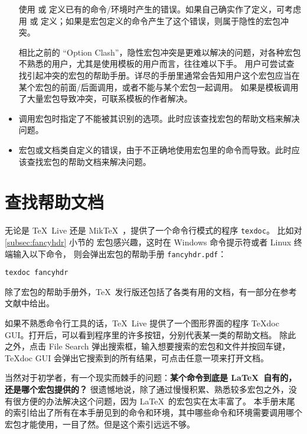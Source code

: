 \begin{itemize}
使用  或  定义已有的命令/环境时产生的错误。如果自己确实作了定义，可考虑用
 或  定义；如果是宏包定义的命令产生了这个错误，则属于隐性的宏包冲突。

相比之前的 ``Option Clash''{}，隐性宏包冲突是更难以解决的问题，对各种宏包不熟悉的用户，尤其是使用模板的用户而言，往往难以下手。
用户可尝试查找引起冲突的宏包的帮助手册。详尽的手册里通常会告知用户这个宏包应当在某个宏包的前面/后面调用，或者不能与某个宏包一起调用。
如果是模板调用了大量宏包导致冲突，可联系模板的作者解决。

\item {}

调用宏包时指定了不能被其识别的选项。此时应该查找宏包的帮助文档来解决问题。

\item {}

宏包或文档类自定义的错误，由于不正确地使用宏包里的命令而导致。此时应该查找宏包的帮助文档来解决问题。

\end{itemize}

\section{查找帮助文档}\label{sec:texdoc}

无论是 \TeX\ Live 还是 Mik\TeX\ ，提供了一个命令行模式的程序 \texttt{texdoc}。
比如对 \ref{subsec:fancyhdr} 小节的  宏包感兴趣，这时在 Windows 命令提示符或者 Linux 终端输入以下命令，
则会弹出宏包的帮助手册 \texttt{fancyhdr.pdf}：
\begin{verbatim}
texdoc fancyhdr
\end{verbatim}

除了宏包的帮助手册外，\TeX\ 发行版还包括了各类有用的文档，有一部分在参考文献中给出。

如果不熟悉命令行工具的话，\TeX\ Live 提供了一个图形界面的程序 TeXdoc GUI。打开后，可以看到程序里的许多按钮，分别代表某一类的帮助文档。
除此之外，点击 File Search 弹出搜索框，输入想要搜索的宏包和文件并按回车键，TeXdoc GUI 会弹出它搜索到的所有结果，可点击任意一项来打开文档。

当然对于初学者，有一个现实而棘手的问题：\textbf{某个命令到底是 \LaTeX\ 自有的，还是哪个宏包提供的？}
很遗憾地说，除了通过慢慢积累、熟悉较多宏包之外，没有很方便的办法解决这个问题，因为 \LaTeX\ 的宏包实在太丰富了。
本手册末尾的索引给出了所有在本手册见到的命令和环境，其中哪些命令和环境需要调用哪个宏包才能使用，一目了然。但是这个索引远远不够。

